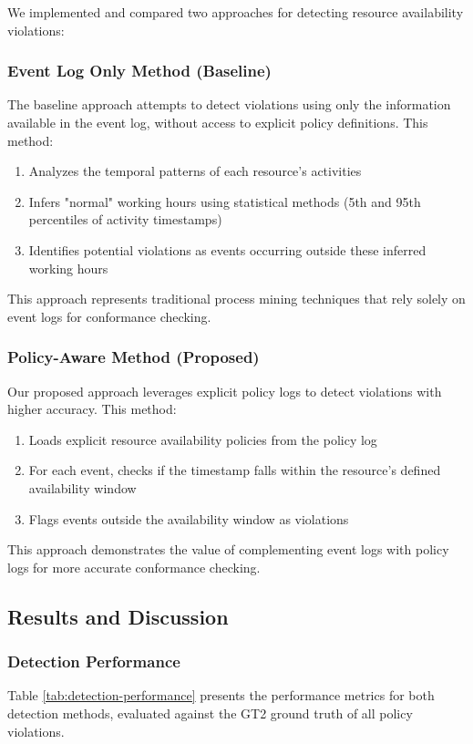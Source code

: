 We implemented and compared two approaches for detecting resource availability violations:

\subsubsection{Event Log Only Method (Baseline)}
The baseline approach attempts to detect violations using only the information available in the event log, without access to explicit policy definitions. This method:

\begin{enumerate}
    \item Analyzes the temporal patterns of each resource's activities
    \item Infers "normal" working hours using statistical methods (5th and 95th percentiles of activity timestamps)
    \item Identifies potential violations as events occurring outside these inferred working hours
\end{enumerate}

This approach represents traditional process mining techniques that rely solely on event logs for conformance checking.

\subsubsection{Policy-Aware Method (Proposed)}
Our proposed approach leverages explicit policy logs to detect violations with higher accuracy. This method:

\begin{enumerate}
    \item Loads explicit resource availability policies from the policy log
    \item For each event, checks if the timestamp falls within the resource's defined availability window
    \item Flags events outside the availability window as violations
\end{enumerate}

This approach demonstrates the value of complementing event logs with policy logs for more accurate conformance checking.

\subsection{Results and Discussion}

\subsubsection{Detection Performance}
Table \ref{tab:detection-performance} presents the performance metrics for both detection methods, evaluated against the GT2 ground truth of all policy violations.

